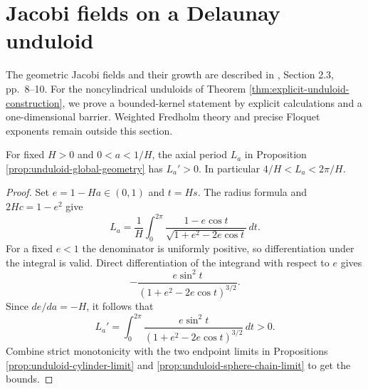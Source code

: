 \chapter{Jacobi fields on a Delaunay unduloid}\label{sec:delaunay-jacobi}
The geometric Jacobi fields and their growth are described in \cite{Maz02}, Section 2.3, pp.~8--10. For the noncylindrical unduloids of Theorem \ref{thm:explicit-unduloid-construction}, we prove a bounded-kernel statement by explicit calculations and a one-dimensional barrier. Weighted Fredholm theory and precise Floquet exponents remain outside this section.

\begin{proposition}\label{prop:unduloid-period-derivative}
For fixed $H>0$ and $0<a<1/H$, the axial period $L_a$ in Proposition \ref{prop:unduloid-global-geometry} has $L_a'>0$. In particular $4/H<L_a<2\pi/H$.
\end{proposition}
\begin{proof}
Set $e=1-Ha\in(0,1)$ and $t=Hs$. The radius formula and $2Hc=1-e^2$ give
\[
 L_a=\frac1H\int_0^{2\pi}\frac{1-e\cos t}{\sqrt{1+e^2-2e\cos t}}\,dt.
\]
For a fixed $e<1$ the denominator is uniformly positive, so differentiation under the integral is valid. Direct differentiation of the integrand with respect to $e$ gives
\[
 -\frac{e\sin^2t}{(1+e^2-2e\cos t)^{3/2}}.
\]
Since $de/da=-H$, it follows that
\[
 L_a'=\int_0^{2\pi}\frac{e\sin^2t}{(1+e^2-2e\cos t)^{3/2}}\,dt>0.
\]
Combine strict monotonicity with the two endpoint limits in Propositions \ref{prop:unduloid-cylinder-limit} and \ref{prop:unduloid-sphere-chain-limit} to get the bounds.
\end{proof}

